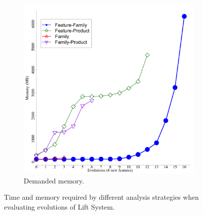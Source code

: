 \begin{figure}[p]
\begin{subfigure}[t]{0.5\columnwidth}
    \includegraphics[width=1.0\columnwidth]{img/liftSpace}
    \caption{Demanded memory.}
    \label{fig:lift-footprint}
  \end{subfigure}
  \caption{Time and memory required by different analysis strategies when
  evaluating evolutions of Lift System.}
  \label{fig:lift-scalability}
\end{figure}


